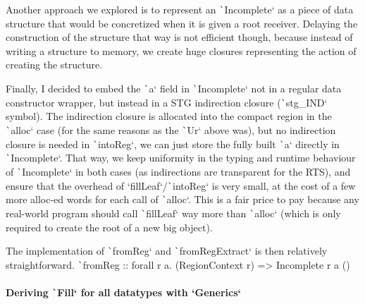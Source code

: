 \documentclass[english]{jflart}
\begin{document}
Another approach we explored is to represent an \texttt`Incomplete` as a piece of data structure that would be concretized when it is given a root receiver. Delaying the construction of the structure that way is not efficient though, because instead of writing a structure to memory, we create huge closures representing the action of creating the structure.

Finally, I decided to embed the \texttt`a` field in \texttt`Incomplete` not in a regular data constructor wrapper, but instead in a STG indirection closure (\texttt`stg_IND` symbol). The indirection closure is allocated into the compact region in the \texttt`alloc` case (for the same reasons as the \texttt`Ur` above was), but no indirection closure is needed in \texttt`intoReg`, we can just store the fully built \texttt`a` directly in \texttt`Incomplete`. That way, we keep uniformity in the typing and runtime behaviour of \texttt`Incomplete` in both cases (as indirections are transparent for the RTS), and ensure that the overhead of `fillLeaf`/\texttt`intoReg` is very small, at the cost of a few more alloc-ed words for each call of \texttt`alloc`. This is a fair price to pay because any real-world program should call \texttt`fillLeaf` way more than \texttt`alloc` (which is only required to create the root of a new big object).

The implementation of \texttt`fromReg` and \texttt`fromRegExtract` is then relatively straightforward. \texttt`fromReg :: forall r a. (RegionContext r) => Incomplete r a () %

\paragraph{Deriving \texttt`Fill` for all datatypes with `Generics`}
\end{document}

